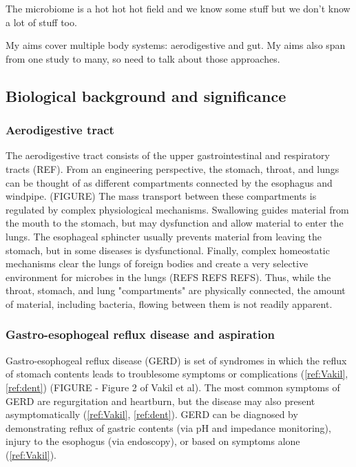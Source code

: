 \documentclass[12pt]{article}
\begin{document}
The microbiome is a hot hot hot field and we know some stuff but we don't know a lot of stuff too.

My aims cover multiple body systems: aerodigestive and gut. My aims also span from one study to many, so need to talk about those approaches.

\subsection{Biological background and significance}

\subsubsection{Aerodigestive tract}
The aerodigestive tract consists of the upper gastrointestinal and respiratory tracts (REF). From an engineering perspective, the stomach, throat, and lungs can be thought of as different compartments connected by the esophagus and windpipe. (FIGURE) The mass transport between these compartments is regulated by complex physiological mechanisms. Swallowing guides material from the mouth to the stomach, but may dysfunction and allow material to enter the lungs. The esophageal sphincter usually prevents material from leaving the stomach, but in some diseases is dysfunctional. Finally, complex homeostatic mechanisms clear the lungs of foreign bodies and create a very selective environment for microbes in the lungs (REFS REFS REFS). Thus, while the throat, stomach, and lung "compartments" are physically connected, the amount of material, including bacteria, flowing between them is not readily apparent. 

\subsubsection{Gastro-esophogeal reflux disease and aspiration}

Gastro-esophogeal reflux disease (GERD) is set of syndromes in which the reflux of stomach contents leads to troublesome symptoms or complications (\ref{ref:Vakil}, \ref{ref:dent}) (FIGURE - Figure 2 of Vakil et al). The most common symptoms of GERD are regurgitation and heartburn, but the disease may also present asymptomatically (\ref{ref:Vakil}, \ref{ref:dent}). GERD can be diagnosed by demonstrating reflux of gastric contents (via pH and impedance monitoring), injury to the esophogus (via endoscopy), or based on symptoms alone (\ref{ref:Vakil}). 
\end{document}
